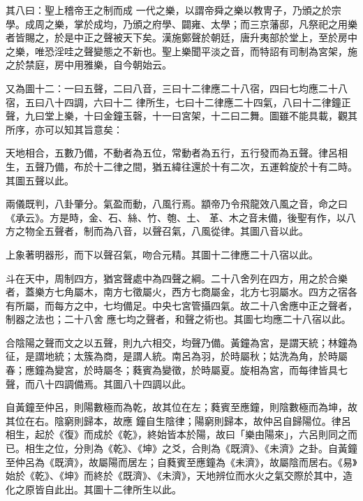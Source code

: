 \begin{pinyinscope}
 其八曰：聖上稽帝王之制而成
 一代之樂，以謂帝舜之樂以教冑子，乃頒之於宗學。成周之樂，掌於成均，乃頒之府學、闢雍、太學；而三京藩邸，凡祭祀之用樂者皆賜之，於是中正之聲被天下矣。漢施鄭聲於朝廷，唐升夷部於堂上，至於房中之樂，唯恐淫哇之聲變態之不新也。聖上樂聞平淡之音，而特詔有司制為宮架，施之於禁庭，房中用雅樂，自今朝始云。



 又為圖十二：一曰五聲，二曰八音，三曰十二律應二十八宿，四曰七均應二十八宿，五曰八十四調，六曰十二
 律所生，七曰十二律應二十四氣，八曰十二律鐘正聲，九曰堂上樂，十曰金鐘玉磬，十一曰宮架，十二曰二舞。圖雖不能具載，觀其所序，亦可以知其旨意矣：



 天地相合，五數乃備，不動者為五位，常動者為五行，五行發而為五聲。律呂相生，五聲乃備，布於十二律之間，猶五緯往還於十有二次，五運斡旋於十有二時。其圖五聲以此。



 兩儀既判，八卦肇分。氣盈而動，八風行焉。顓帝乃令飛龍效八風之音，命之曰《承云》。方是時，金、石、絲、竹、匏、土、
 革、木之音未備，後聖有作，以八方之物全五聲者，制而為八音，以聲召氣，八風從律。其圖八音以此。



 上象著明器形，而下以聲召氣，吻合元精。其圖十二律應二十八宿以此。



 斗在天中，周制四方，猶宮聲處中為四聲之綱。二十八舍列在四方，用之於合樂者，蓋樂方七角屬木，南方七徵屬火，西方七商屬金，北方七羽屬水。四方之宿各有所屬，而每方之中，七均備足。中央七宮管攝四氣。故二十八舍應中正之聲者，制器之法也；二十八舍
 應七均之聲者，和聲之術也。其圖七均應二十八宿以此。



 合陰陽之聲而文之以五聲，則九六相交，均聲乃備。黃鐘為宮，是謂天統；林鐘為征，是謂地統；太簇為商，是謂人統。南呂為羽，於時屬秋；姑洗為角，於時屬春；應鐘為變宮，於時屬冬；蕤賓為變徵，於時屬夏。旋相為宮，而每律皆具七聲，而八十四調備焉。其圖八十四調以此。



 自黃鐘至仲呂，則陽數極而為乾，故其位在左；蕤賓至應鐘，則陰數極而為坤，故其位在右。陰窮則歸本，故應
 鐘自生陰律；陽窮則歸本，故仲呂自歸陽位。律呂相生，起於《復》而成於《乾》，終始皆本於陽，故曰「樂由陽來」，六呂則同之而已。相生之位，分則為《乾》、《坤》之爻，合則為《既濟》、《未濟》之卦。自黃鐘至仲呂為《既濟》，故屬陽而居左；自蕤賓至應鐘為《未濟》，故屬陰而居右。《易》始於《乾》、《坤》而終於《既濟》、《未濟》，天地辨位而水火之氣交際於其中，造化之原皆自此出。其圖十二律所生以此。




\end{pinyinscope}
